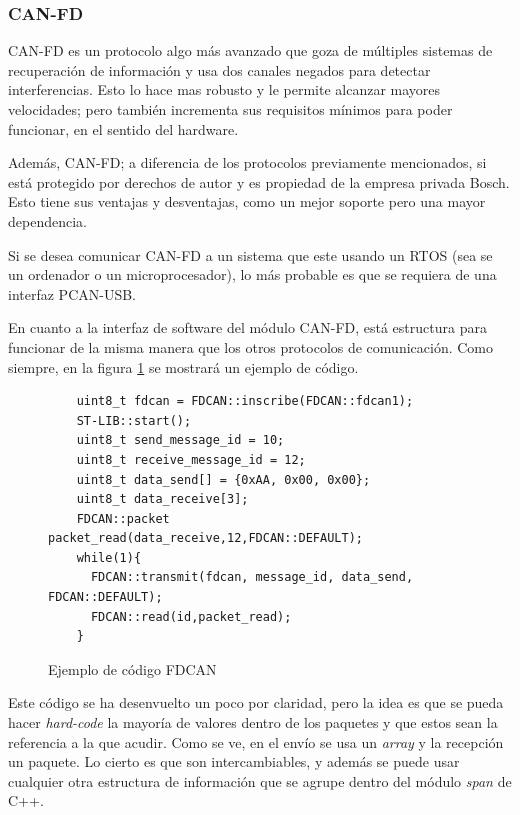 \documentclass{report}
\begin{document}
\subsubsection{CAN-FD}
CAN-FD\cite{web:CANFD:CiA} es un protocolo algo más avanzado que goza de múltiples sistemas de recuperación de información y usa dos canales negados para detectar interferencias. Esto lo hace mas robusto y le permite alcanzar mayores velocidades; pero también incrementa sus requisitos mínimos para poder funcionar, en el sentido del hardware. 
\par 
Además, CAN-FD; a diferencia de los protocolos previamente mencionados, si está protegido por derechos de autor y es propiedad de la empresa privada Bosch. Esto tiene sus ventajas y desventajas, como un mejor soporte pero una mayor dependencia. 
\par \vspace{0.3cm}
Si se desea comunicar CAN-FD a un sistema que este usando un RTOS (sea se un ordenador o un microprocesador), lo más probable es que se requiera de una interfaz PCAN-USB. 
\par \vspace{0.3cm}
En cuanto a la interfaz de software del módulo CAN-FD, está estructura para funcionar de la misma manera que los otros protocolos de comunicación. Como siempre, en la figura \ref{FDCANcode} se mostrará un ejemplo de código. 

\begin{figure}[h]
  \begin{lstlisting}
    uint8_t fdcan = FDCAN::inscribe(FDCAN::fdcan1);
    ST-LIB::start();
    uint8_t send_message_id = 10;
    uint8_t receive_message_id = 12;
    uint8_t data_send[] = {0xAA, 0x00, 0x00}; 
    uint8_t data_receive[3]; 
    FDCAN::packet packet_read(data_receive,12,FDCAN::DEFAULT);
    while(1){
      FDCAN::transmit(fdcan, message_id, data_send, FDCAN::DEFAULT);
      FDCAN::read(id,packet_read);
    }
  \end{lstlisting}
  \caption{Ejemplo de código FDCAN}
  \label{FDCANcode}
  \end{figure}

Este código se ha desenvuelto un poco por claridad, pero la idea es que se pueda hacer \textit{hard-code} la mayoría de valores dentro de los paquetes y que estos sean la referencia a la que acudir. Como se ve, en el envío se usa un \textit{array} y la recepción un paquete. Lo cierto es que son intercambiables, y además se puede usar cualquier otra estructura de información que se agrupe dentro del módulo \textit{span} de C++. 
\end{document}
